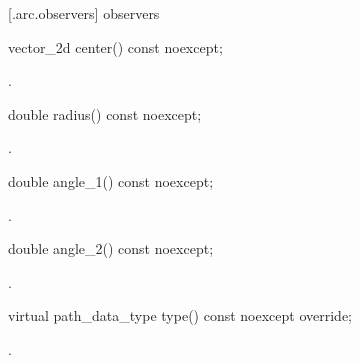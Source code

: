  [\iotwod.arc.observers]{ observers}

\begin{itemdecl}
    vector_2d center() const noexcept;
\end{itemdecl}
\begin{itemdescr}
	\pnum
	\returns
	.

\end{itemdescr}

\begin{itemdecl}
    double radius() const noexcept;
\end{itemdecl}
\begin{itemdescr}
	\pnum
	\returns
	.

\end{itemdescr}

\begin{itemdecl}
    double angle_1() const noexcept;
\end{itemdecl}
\begin{itemdescr}
	\pnum
	\returns
	.

\end{itemdescr}

\begin{itemdecl}
    double angle_2() const noexcept;
\end{itemdecl}
\begin{itemdescr}
	\pnum
	\returns
	.

\end{itemdescr}

\begin{itemdecl}
    virtual path_data_type type() const noexcept override;
\end{itemdecl}
\begin{itemdescr}
	\pnum
	\returns
	.

\end{itemdescr}
